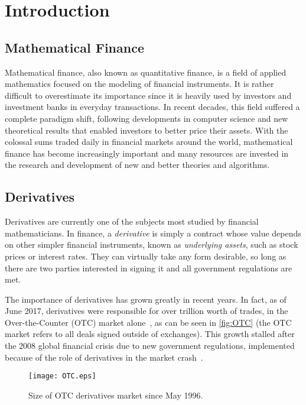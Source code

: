 \chapter{Introduction}
\label{chapter:introduction}
\section{Mathematical Finance}
\label{section:mathematical finance}
Mathematical finance, also known as quantitative finance, is a field of applied mathematics focused on the modeling of financial instruments.
It is rather difficult to overestimate its importance since it is heavily used by investors and investment banks in everyday transactions.
In recent decades, this field suffered a complete paradigm shift, following developments in computer science and new theoretical results that enabled investors to better price their assets.
With the colossal sums traded daily in financial markets around the world, mathematical finance has become increasingly important and many resources are invested in the research and development of new and better theories and algorithms.


\section{Derivatives}
\label{section:derivatives}
Derivatives are currently one of the subjects most studied by financial mathematicians.
In finance, a \emph{derivative} is simply a contract whose value depends on other simpler financial instruments, known as \emph{underlying assets}, such as stock prices or interest rates.
They can virtually take any form desirable, so long as there are two parties interested in signing it and all government regulations are met.


The importance of derivatives has grown greatly in recent years. In fact, as of June 2017, derivatives were responsible for over  trillion worth of trades, in the Over-the-Counter (OTC) market alone~\cite{BIS}, as can be seen in \autoref{fig:OTC} (the OTC market refers to all deals signed outside of exchanges).
This growth stalled after the 2008 global financial crisis due to new government regulations, implemented because of the role of derivatives in the market crash~\cite{FT}. 


\begin{figure}[!htb]
    \centering
      \texttt{[image: OTC.eps]}
      \caption{Size of OTC derivatives market since May 1996.}\label{fig:OTC}
    \end{figure}

